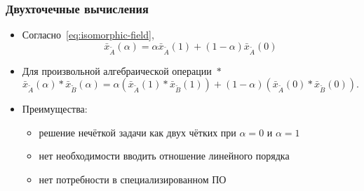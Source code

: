 \documentclass[12pt]{beamer}
\begin{document}
\begin{frame}
  \frametitle{Двухточечные вычисления}
  \begin{itemize}
    \item Согласно~\eqref{eq:isomorphic-field},
      \begin{equation}
        \label{eq:isomorphic-field-shortened}
        \bar{x}_{\tilde A}\left( \alpha \right)=\alpha \bar{x}_{\tilde A}\left( 1 \right)+\left( 1-\alpha  \right) \bar{x}_{\tilde A}\left( 0 \right)
      \end{equation}
    \item Для произвольной алгебраической операции~$*$
      \begin{equation}
      \label{eq:two-point-calculations}
        \bar{x}_{\tilde A}\left( \alpha \right)*\bar{x}_{\tilde B}\left(\alpha \right)=\alpha \left(\bar{x}_{\tilde A}\left( 1 \right)*\bar{x}_{\tilde B}\left(1 \right) \right)+\left(1-\alpha \right)\left(\bar{x}_{\tilde A}\left(0 \right)*\bar{x}_{\tilde B}\left(0 \right) \right).
      \end{equation}
    \item Преимущества:
      \begin{itemize}
        \item решение нечёткой задачи как двух чётких при $\alpha=0$ и $\alpha=1$
        \item нет необходимости вводить отношение линейного порядка
        \item нет потребности в специализированном ПО
      \end{itemize}
  \end{itemize}
\end{frame}
\end{document}
